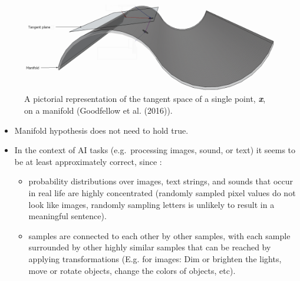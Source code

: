 \begin{vbframe}
\begin{itemize}
\end{itemize} 
        \begin{figure}[h]
            \centering
            \includegraphics[width=0.8\linewidth]{plots/tangent_plane.png}
            \caption{A pictorial representation of the tangent space of a single point, \textbf{\textit{x}}, on a manifold (Goodfellow et al. (2016)).}
        \end{figure}
     
       \framebreak
       
      
        \begin{itemize}
        \item Manifold hypothesis does not need to  hold true.
        \item In the context of AI tasks (e.g.~processing images, sound, or text) it seems to be at least approximately correct, since :
        \begin{itemize}
        \item probability distributions over images, text strings, and sounds that occur in real life are highly concentrated (randomly sampled pixel values do not look like images, randomly sampling letters is unlikely to result in a meaningful sentence).
        \item samples are connected to each other by other samples, with each sample surrounded by other highly similar samples that can be reached by applying transformations (E.g. for images: Dim or brighten the lights, move or rotate objects, change the colors of objects,  etc).
     \end{itemize}
    \end{itemize} 

\end{vbframe}


